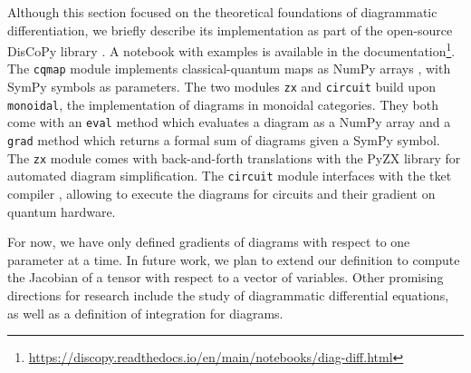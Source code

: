 Although this section focused on the theoretical foundations of diagrammatic
differentiation, we briefly describe its implementation as
part of the open-source DisCoPy library \cite{DeFeliceEtAl20}. A notebook
with examples is available in the documentation\footnote{
\href{https://discopy.readthedocs.io/en/main/notebooks/diag-diff.html}{
https://discopy.readthedocs.io/en/main/notebooks/diag-diff.html}}.
The \texttt{cqmap} module implements classical-quantum maps as NumPy arrays
\cite{VanDerWaltEtAl11}, with SymPy \cite{MeurerEtAl17} symbols as parameters.
The two modules \texttt{zx} and \texttt{circuit} build upon \texttt{monoidal},
the implementation of diagrams in monoidal categories. They both come with
an \texttt{eval} method which evaluates a diagram as a NumPy array and a
\texttt{grad} method which returns a formal sum of diagrams given a SymPy symbol.
The \texttt{zx} module comes with back-and-forth translations with the PyZX
library \cite{KissingerVanDeWetering19} for automated diagram simplification.
The \texttt{circuit} module interfaces with the tket compiler \cite{SivarajahEtAl20},
allowing to execute the diagrams for circuits and their gradient on quantum hardware.

For now, we have only defined gradients of diagrams with respect to one
parameter at a time. In future work, we plan to extend our definition to
compute the Jacobian of a tensor with respect to a vector of variables.
Other promising directions for research include the study of diagrammatic
differential equations, as well as a definition of integration for diagrams.
